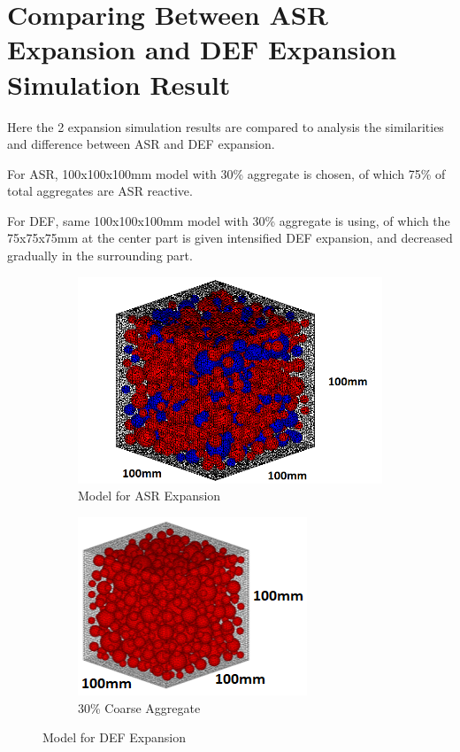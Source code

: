 \clearpage
\section{Comparing Between ASR Expansion and DEF Expansion Simulation Result}


Here the 2 expansion simulation results are compared to analysis the similarities and difference between ASR and DEF expansion.

For ASR, 100x100x100mm model with 30\%  aggregate is chosen, of which 75\% of total aggregates are ASR reactive.

For DEF, same 100x100x100mm model with 30\%  aggregate is using, of which the 75x75x75mm at the center part is given intensified DEF expansion, and decreased gradually in the surrounding part.

\begin{figure}[!h]
\centering
\begin{subfigure}{.5\textwidth}
  \centering
  \includegraphics[width=.8\linewidth]{Files/Aggregate/A30P75.png}
  \caption{Model for ASR Expansion}
  \label{fig:A15_model}
\end{subfigure}%
\begin{subfigure}{.5\textwidth}
  \centering
  \includegraphics[width=.6\linewidth]{Files/Aggregate/A30.png}
  \caption{30\% Coarse Aggregate}
  \label{fig:A15_model}
\end{subfigure}
\caption{Model for DEF Expansion}
\label{fig:Aggregate_Percentage}
\end{figure}

